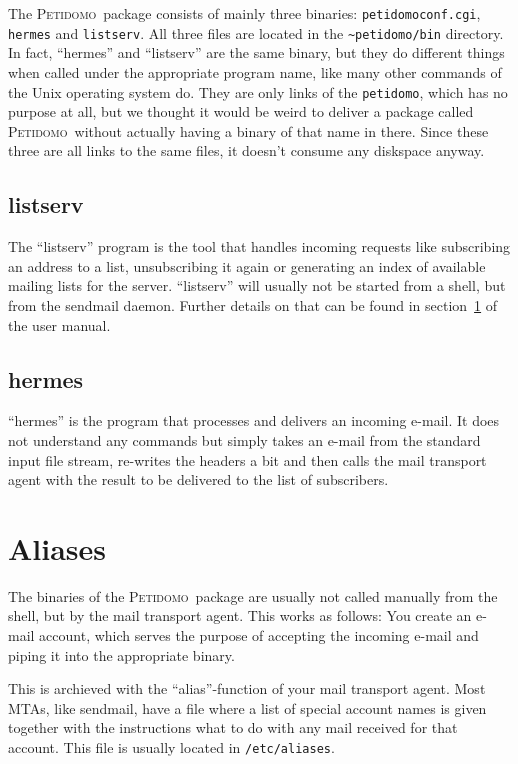 \documentclass[a4paper]{report}
\newcommand{\Petidomo}{{\scshape Peti\-domo}}
\newcommand{\file}[1]{{\tt #1}}
\begin{document}
The \Petidomo\ package consists of mainly three binaries:
\file{petidomoconf.cgi}, \file{hermes} and \file{listserv}. All three
files are located in the \file{\~{}petidomo/bin} directory. In fact,
``hermes'' and ``listserv'' are the same binary, but they do different
things when called under the appropriate program name, like many other
commands of the Unix operating system do. They are only links of the
\file{petidomo}, which has no purpose
at all, but we thought it would be weird to deliver a package called
\Petidomo\ without actually having a binary of that name in there.
Since these three are all links to the same files, it doesn't consume
any diskspace anyway.

\subsection{listserv}

The ``listserv'' program is the tool that handles incoming requests
like subscribing an address to a list, unsubscribing it again or
generating an index of available mailing lists for the server.
``listserv'' will usually not be started from a shell, but from the
sendmail daemon. Further details on that can be found in
section~\ref{aliases} of the user manual.

\subsection{hermes}

``hermes'' is the program that processes and delivers an incoming
e-mail. It does not understand any commands but simply takes an e-mail
from the standard input file stream, re-writes the headers a bit and
then calls the mail transport agent with the result to be delivered to
the list of subscribers.

\section{Aliases}
\label{aliases}

The binaries of the \Petidomo\ package are usually not called manually
from the shell, but by the mail transport agent. This works as
follows: You create an e-mail account, which serves the purpose of
accepting the incoming e-mail and piping it into the appropriate
binary.

This is archieved with the ``alias''-function of your mail transport
agent. Most MTAs, like sendmail, have a file where a list of special
account names is given together with the instructions what to do with
any mail received for that account. This file is usually located in
\file{/etc/aliases}.
\end{document}
